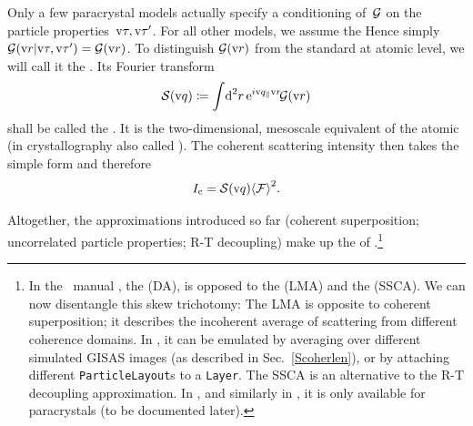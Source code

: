 Only a few paracrystal models actually specify
a conditioning of~$\mathcal{G}$ on the particle properties~$\text{v}\tau,\text{v}\tau'$.
For all other models, we assume the
Hence simply $\mathcal{G}(\text{v}{r}|\text{v}\tau,\text{v}\tau')=\mathcal{G}(\text{v}{r})$.
To distinguish $\mathcal{G}(\text{v}{r})$ from the standard 
%
at atomic level, we will call it the
.
%
Its Fourier transform
\begin{equation}
  \mathcal{S}(\text{v}{q})\coloneqq   \int\!\text{d}^2r\,   \text{e}^{i\text{v}{q}_{\parallel}\text{v}{r}}\!   \mathcal{G}(\text{v}{r})
\end{equation}
shall be called the .
It is the two-dimensional, mesoscale equivalent of
the atomic 
%
(in crystallography also called ).
%
The coherent scattering intensity then takes the simple form
and therefore
\Emph
{\begin{equation}
  I_\text{c} = \mathcal{S}(\text{v}{q}) {\left\langle\mathcal{F}\right\rangle}^2.
\end{equation}\vskip -5pt}

Altogether, the approximations introduced so far
(coherent superposition; uncorrelated particle properties;
R-T decoupling)
make up the 
of \IsGISAXS.\footnote
{In the \IsGISAXS\ manual \cite[Sec.~2.2]{Laz08},
the  (DA),
%
%
is opposed to the
 (LMA)
%
%
and the
 (SSCA).
%
%
We can now disentangle this skew trichotomy:
The LMA is opposite to coherent superposition;
it describes the incoherent average of
scattering from different coherence domains.
In \BornAgain,
it can be emulated by averaging over different simulated GISAS images
(as described in Sec.~\ref{Scoherlen}),
or by attaching different \texttt{ParticleLayout}s to a \texttt{Layer}.
The SSCA is an alternative to the R-T decoupling approximation.
In \IsGISAXS, and similarly in \BornAgain,
it is only available for paracrystals
(to be documented later).
}
\fi

